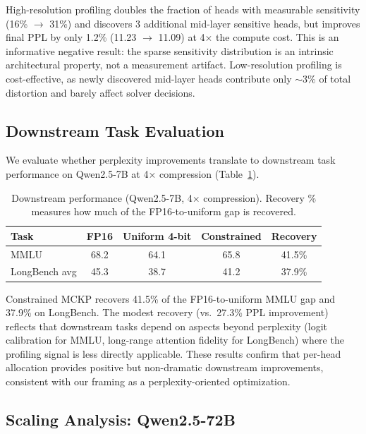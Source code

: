 \documentclass[11pt]{article}
\begin{document}
High-resolution profiling doubles the fraction of heads with measurable sensitivity (16\% $\to$ 31\%) and discovers 3 additional mid-layer sensitive heads, but improves final PPL by only 1.2\% (11.23 $\to$ 11.09) at 4$\times$ the compute cost.
This is an informative negative result: the sparse sensitivity distribution is an intrinsic architectural property, not a measurement artifact.
Low-resolution profiling is cost-effective, as newly discovered mid-layer heads contribute only $\sim$3\% of total distortion and barely affect solver decisions.

\subsection{Downstream Task Evaluation}
\label{sec:downstream}

We evaluate whether perplexity improvements translate to downstream task performance on Qwen2.5-7B at 4$\times$ compression (Table~\ref{tab:downstream}).

\begin{table}[h]
\centering
\caption{Downstream performance (Qwen2.5-7B, 4$\times$ compression). Recovery \% measures how much of the FP16-to-uniform gap is recovered.}
\label{tab:downstream}
\begin{tabular}{lcccc}
\toprule
\textbf{Task} & \textbf{FP16} & \textbf{Uniform 4-bit} & \textbf{Constrained} & \textbf{Recovery} \\
\midrule
MMLU          & 68.2 & 64.1 & 65.8 & 41.5\% \\
LongBench avg & 45.3 & 38.7 & 41.2 & 37.9\% \\
\bottomrule
\end{tabular}
\end{table}

Constrained MCKP recovers 41.5\% of the FP16-to-uniform MMLU gap and 37.9\% on LongBench.
The modest recovery (vs.\ 27.3\% PPL improvement) reflects that downstream tasks depend on aspects beyond perplexity (logit calibration for MMLU, long-range attention fidelity for LongBench) where the profiling signal is less directly applicable.
These results confirm that per-head allocation provides positive but non-dramatic downstream improvements, consistent with our framing as a perplexity-oriented optimization.

\subsection{Scaling Analysis: Qwen2.5-72B}
\label{sec:scaling}
\end{document}
